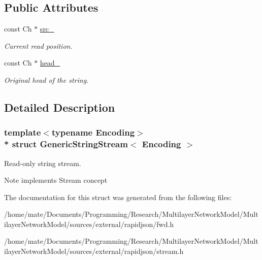\subsection*{Public Attributes}
\begin{DoxyCompactItemize}
\item 
const Ch $\ast$ \hyperlink{structGenericStringStream_aeda813798e3f2d6bfdac86afc11b6b80}{src\+\_\+}\hypertarget{structGenericStringStream_aeda813798e3f2d6bfdac86afc11b6b80}{}\label{structGenericStringStream_aeda813798e3f2d6bfdac86afc11b6b80}

\begin{DoxyCompactList}\small\item\em Current read position. \end{DoxyCompactList}\item 
const Ch $\ast$ \hyperlink{structGenericStringStream_a3c86ef1e1f0655028cb8a3afce11ee4f}{head\+\_\+}\hypertarget{structGenericStringStream_a3c86ef1e1f0655028cb8a3afce11ee4f}{}\label{structGenericStringStream_a3c86ef1e1f0655028cb8a3afce11ee4f}

\begin{DoxyCompactList}\small\item\em Original head of the string. \end{DoxyCompactList}\end{DoxyCompactItemize}


\subsection{Detailed Description}
\subsubsection*{template$<$typename Encoding$>$\\*
struct Generic\+String\+Stream$<$ Encoding $>$}

Read-\/only string stream. 

\begin{DoxyNote}{Note}
implements Stream concept 
\end{DoxyNote}


The documentation for this struct was generated from the following files\+:\begin{DoxyCompactItemize}
\item 
/home/mate/\+Documents/\+Programming/\+Research/\+Multilayer\+Network\+Model/\+Multilayer\+Network\+Model/sources/external/rapidjson/fwd.\+h\item 
/home/mate/\+Documents/\+Programming/\+Research/\+Multilayer\+Network\+Model/\+Multilayer\+Network\+Model/sources/external/rapidjson/stream.\+h\end{DoxyCompactItemize}
